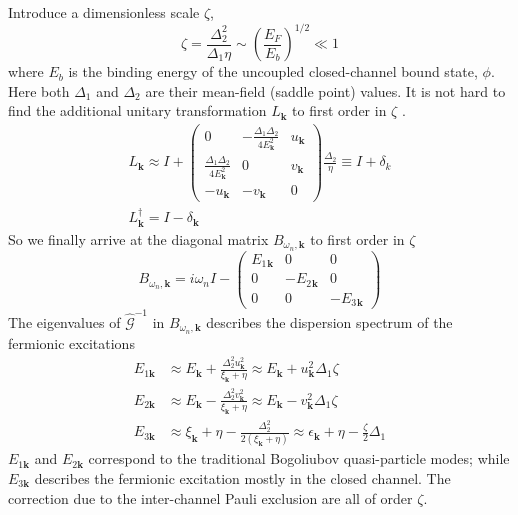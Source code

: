 \documentclass[reprint,pra]{revtex4-1}
\newcommand{\vk}{\ensuremath{\mathbf{k}}}
\newcommand{\br}[1]{\ensuremath{\left(#1\right)}}
\newcommand{\mtrx}[1]{\ensuremath{\begin{pmatrix}#1\end{pmatrix}}}
\newcommand{\dg}{\ensuremath{\dagger}}
\newcommand{\nG}{\ensuremath{\hat{\mathcal{G}}^{-1}}}
\begin{document}
Introduce a dimensionless scale $\zeta$,
\begin{equation}\label{eq:pathInt2:zetaDef}
\boxed{\zeta=\frac{\Delta_{2}^{2}}{\Delta_{1}\eta}\sim\br{\frac{E_{F}}{E_{b}}}^{1/2}\ll1}
\end{equation}
where $E_{b}$ is the binding energy of the uncoupled closed-channel bound state, $\phi$.
Here both $\Delta_{1}$ and $\Delta_{2}$ are their mean-field (saddle point) values.  
It is not hard to find  the additional unitary transformation $L_{\vk}$ to   first order in $\zeta$ .
\begin{gather}\label{eq:pathInt2:L1}
L_{\vk}\approx{}I+
\mtrx{0&-\frac{\Delta_{1}{}\Delta_{2}{}}{4E^{2}_{\vk}}&u_{\vk}\\
\frac{\Delta_{1}{}\Delta_{2}{}}{4E^{2}_{\vk}}&0&v_{\vk}\\
-u_{\vk}&-v_{\vk}&0
}\frac{\Delta_{2}{}}{\eta}
\equiv{}I+\delta_{k}\\
L^{\dg}_{\vk}=I-\delta_{\vk}\nonumber
\end{gather}
So we finally arrive at the diagonal matrix $B_{\omega_{n},\vk}$ to first order in $\zeta$
\begin{equation}\label{eq:pathInt2:Bapprox}
B_{\omega_{n},\vk}=i\omega_{n}I-
	\begin{pmatrix}E_{1}{}_{\vk}&0&0\\0&-E_{2}{}_{\vk}&0\\0&0&-E_{3}{}_{\vk}\end{pmatrix}
\end{equation}
The eigenvalues of $\nG$  in $B_{\omega_{n},\vk}$ describes the dispersion spectrum of the  fermionic excitations
\begin{align}\label{eq:pathInt2:xiExpand}
E_{1\vk}&\approx{}E_{\vk}+\frac{\Delta_{2}^{2}u_{\vk}^{2}}{\xi_{\vk}+\eta}
\approx{}E_{\vk}+u_{\vk}^{2}\Delta_{1}\zeta\\
E_{2\vk}&\approx{}E_{\vk}-\frac{\Delta_{2}^{2}v_{\vk}^{2}}{\xi_{\vk}+\eta}
\approx{}E_{\vk}-v_{\vk}^{2}\Delta_{1}\zeta\label{eq:pathInt2:xiExpand2}\\
E_{3\vk}&\approx{}\xi_{\vk}+\eta-\frac{\Delta_{2}^{2}}{2(\xi_{\vk}+\eta)}
\approx{}\epsilon_{\vk}+\eta-\frac{\zeta}{2}\Delta_{1}
\label{eq:pathInt2:xiExpand3}
\end{align}
    $E_{1\vk}$ and $E_{2\vk}$ correspond to the traditional Bogoliubov quasi-particle modes; while $E_{3\vk}$ describes the fermionic excitation mostly in the closed channel.  The correction due to the inter-channel Pauli exclusion are all of order $\zeta$.
\end{document}
